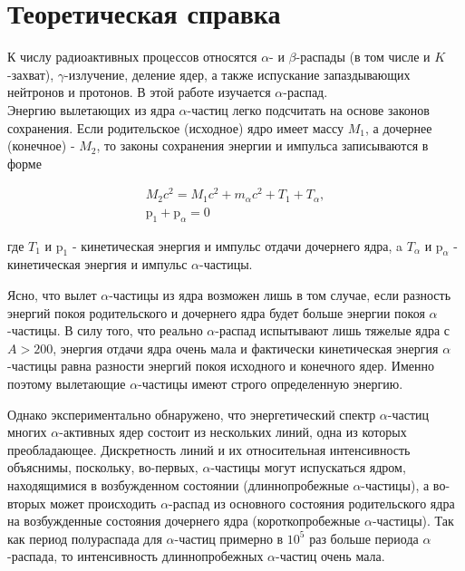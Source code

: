 \documentclass[a4paper, 12pt]{article}
\begin{document}
\tableofcontents
\newpage

\section{Теоретическая справка} 

    К числу радиоактивных процессов относятся $\alpha$- и $\beta$-распады (в том числе и $K$-захват), $\gamma$-излучение, деление ядер, а также испускание запаздывающих нейтронов и протонов. В этой работе изучается $\alpha$-распад.\\
    Энергию вылетающих из ядра $\alpha$-частиц легко подсчитать на основе законов сохранения. Если родительское (исходное) ядро имеет массу $M_1$, а дочернее (конечное) - $M_2$, то законы сохранения энергии и импульса записываются в форме

    $$
    \begin{gathered}
    M_2 c^2=M_1 c^2+m_\alpha c^2+T_1+T_\alpha, \\
    \mathrm{p}_1+\mathrm{p}_\alpha=0
    \end{gathered}
    $$

    где $T_1$ и $\mathrm{p}_1$ - кинетическая энергия и импульс отдачи дочернего ядра, a $T_\alpha$ и $\mathrm{p}_\alpha$ - кинетическая энергия и импульс $\alpha$-частицы.

    Ясно, что вылет $\alpha$-частицы из ядра возможен лишь в том случае, если разность энергий покоя родительского и дочернего ядра будет больше энергии покоя $\alpha$-частицы. В силу того, что реально $\alpha$-распад испытывают лишь тяжелые ядра с $A>200$, энергия отдачи ядра очень мала и фактически кинетическая энергия $\alpha$-частицы равна разности энергий покоя исходного и конечного ядер. Именно поэтому вылетающие $\alpha$-частицы имеют строго определенную энергию.

    Однако экспериментально обнаружено, что энергетический спектр $\alpha$-частиц многих $\alpha$-активных ядер состоит из нескольких линий, одна из которых преобладающее. Дискретность линий и их относительная интенсивность объяснимы, поскольку, во-первых, $\alpha$-частицы могут испускаться ядром, находящимися в возбужденном состоянии (длиннопробежные $\alpha$-частицы), а во-вторых может происходить $\alpha$-распад из основного состояния родительского ядра на возбужденные состояния дочернего ядра (короткопробежные $\alpha$-частицы). Так как период полураспада для $\alpha$-частиц примерно в $10^5$ раз больше периода $\alpha$-распада, то интенсивность длиннопробежных $\alpha$-частиц очень мала.
\end{document}
